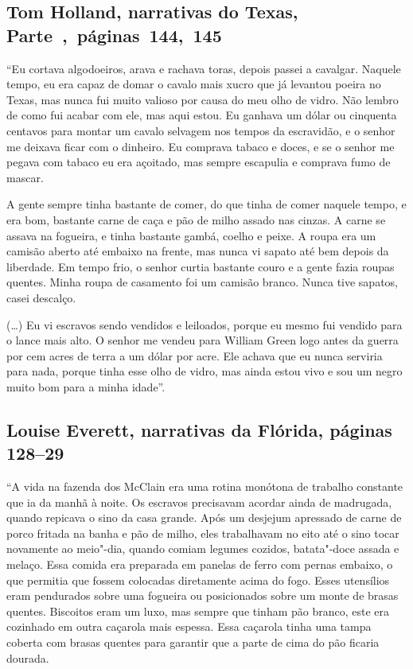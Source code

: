 \subsection{Tom Holland, narrativas do Texas, Parte~,~páginas~144,~145}
\label{ref147}

``Eu cortava algodoeiros, arava e rachava toras, depois passei a
cavalgar. Naquele tempo, eu era capaz de domar o cavalo mais xucro que
já levantou poeira no Texas, mas nunca fui muito valioso por causa do
meu olho de vidro. Não lembro de como fui acabar com ele, mas aqui
estou. Eu ganhava um dólar ou cinquenta centavos para montar um cavalo
selvagem nos tempos da escravidão, e o senhor me deixava ficar com o
dinheiro. Eu comprava tabaco e doces, e se o senhor me pegava com tabaco
eu era açoitado, mas sempre escapulia e comprava fumo de mascar.

A gente sempre tinha bastante de comer, do que tinha de comer naquele
tempo, e era bom, bastante carne de caça e pão de milho assado nas
cinzas. A carne se assava na fogueira, e tinha bastante gambá, coelho e
peixe. A roupa era um camisão aberto até embaixo na frente, mas nunca vi
sapato até bem depois da liberdade. Em tempo frio, o senhor curtia
bastante couro e a gente fazia roupas quentes. Minha roupa de casamento
foi um camisão branco. Nunca tive sapatos, casei descalço.

(\ldots{}) Eu vi escravos sendo vendidos e leiloados, porque eu mesmo
fui vendido para o lance mais alto. O senhor me vendeu para William
Green logo antes da guerra por cem acres de terra a um dólar por acre.
Ele achava que eu nunca serviria para nada, porque tinha esse olho de
vidro, mas ainda estou vivo e sou um negro muito bom para a minha
idade''.

\subsection{Louise Everett, narrativas da Flórida, páginas 128--29}

``A vida na fazenda dos McClain era uma rotina monótona de trabalho
constante que ia da manhã à noite. Os escravos precisavam acordar ainda
de madrugada, quando repicava o sino da casa grande. Após um desjejum
apressado de carne de porco fritada na banha e pão de milho, eles
trabalhavam no eito até o sino tocar novamente ao meio"-dia, quando
comiam legumes cozidos, batata"-doce assada e melaço. Essa comida era
preparada em panelas de ferro com pernas embaixo, o que permitia que
fossem colocadas diretamente acima do fogo. Esses utensílios eram
pendurados sobre uma fogueira ou posicionados sobre um monte de brasas
quentes. Biscoitos eram um luxo, mas sempre que tinham pão branco, este
era cozinhado em outra caçarola mais espessa. Essa caçarola tinha uma
tampa coberta com brasas quentes para garantir que a parte de cima do
pão ficaria dourada.

